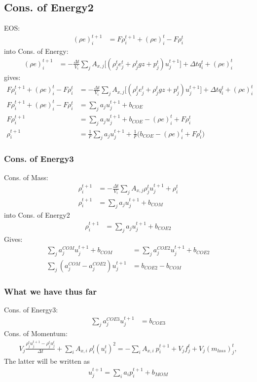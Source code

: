 \documentclass[11pt,letterpaper,notitlepage]{article}
\newcommand{\beqn}{\begin{equation}
		\begin{aligned}}
\newcommand{\eeqn}{\end{aligned}
\end{equation}}
\numberwithin{equation}{section}
\begin{document}
\subsection{Cons. of Energy2}
EOS:
\beqn 
(\rho e)_i^{t+1} &= F\rho_i^{t+1} + (\rho e)_i^t - F\rho_i^t
\eeqn 
into Cons. of Energy:
\beqn
 (\rho e)_i^{t+1} &=
- \frac{\Delta t}{V_i} \sum_j A_{x,j} \biggr[(\rho_j^t e_j^t + \rho_j^t gz + p_j^t)u_j^{t+1}\biggr] 
+ \Delta t q_i^t+(\rho e)_i^t
\eeqn 
gives:
\beqn
F\rho_i^{t+1} + (\rho e)_i^t - F\rho_i^t &=
- \frac{\Delta t}{V_i} \sum_j A_{x,j} \biggr[(\rho_j^t e_j^t + \rho_j^t gz + p_j^t)u_j^{t+1}\biggr] 
+ \Delta t q_i^t+(\rho e)_i^t 
\\
F\rho_i^{t+1} + (\rho e)_i^t - F\rho_i^t &=
\sum_j a_j u_j^{t+1}
+ b_{COE} 
\\
F\rho_i^{t+1} &=
\sum_j a_j u_j^{t+1}
+ b_{COE} - (\rho e)_i^t + F\rho_i^t
\\
\rho_i^{t+1} &= \frac{1}{F} \sum_j a_j u_j^{t+1} + \frac{1}{F} \biggr(b_{COE} - (\rho e)_i^t + F\rho_i^t\biggr)
\eeqn 

\subsubsection{Cons. of Energy3}
Cons. of Mass:
\beqn
\rho_i^{t+1} &= - \frac{\Delta t}{V_i} \sum_j A_{x,j} \rho_j^t u_j^{t+1} + \rho_i^t
\\
\rho_i^{t+1} &= \sum_j a_j u_j^{t+1} + b_{COM}
\eeqn
into Cons. of Energy2
\beqn 
\rho_i^{t+1} &= \sum_j a_j u_j^{t+1} + b_{COE2}
\eeqn 
Gives:
\beqn 
\sum_j a_j^{COM} u_j^{t+1} + b_{COM} &= \sum_j a_j^{COE2} u_j^{t+1} + b_{COE2} \\
\sum_j (a_j^{COM}-a_j^{COE2}) u_j^{t+1} &= b_{COE2} - b_{COM}
\eeqn 

\subsubsection{What we have thus far}
Cons. of Energy3:
\beqn 
\sum_j a_j^{COE3}u_j^{t+1} &= b_{COE3}
\eeqn
Cons. of Momentum:
\beqn 
V_j \frac{\rho_j^t u_j^{t+1} - \rho_j^t u_j^t}{\Delta t} +
\sum_i A_{x,i} \ \rho_i^t (u_i^t)^2  = -\sum_i A_{x,i} \ p_i^{t+1} + V_j f_j^t + V_j (m_{loss})_j^t,
\eeqn
The latter will be written as
\beqn 
u_j^{t+1} = \sum_i a_i p_i^{t+1} + b_{MOM}
\eeqn 
\end{document}
